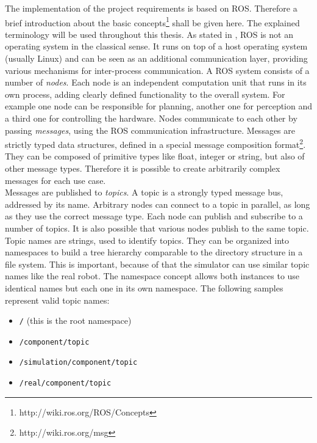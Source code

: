 The implementation of the project requirements is based on ROS. Therefore a brief introduction about the basic concepts\footnote{http://wiki.ros.org/ROS/Concepts} shall be given here. The explained terminology will be used throughout this thesis. As stated in \cite{quigley2009}, ROS is not an operating system in the classical sense. It runs on top of a host operating system (usually Linux) and can be seen as an additional communication layer, providing various mechanisms for inter-process communication. A ROS system consists of a number of \emph{nodes}. Each node is an independent computation unit that runs in its own process, adding clearly defined functionality to the overall system. For example one node can be responsible for planning, another one for perception and a third one for controlling the hardware. Nodes communicate to each other by passing \emph{messages}, using the ROS communication infrastructure. Messages are strictly typed data structures, defined in a special message composition format\footnote{http://wiki.ros.org/msg}. They can be composed of primitive types like float, integer or string, but also of other message types. Therefore it is possible to create arbitrarily complex messages for each use case. \\

Messages are published to \emph{topics}. A topic is a strongly typed message bus, addressed by its name. Arbitrary nodes can connect to a topic in parallel, as long as they use the correct message type. Each node can publish and subscribe to a number of topics. It is also possible that various nodes publish to the same topic. Topic names are strings, used to identify topics. They can be organized into namespaces to build a tree hierarchy comparable to the directory structure in a file system. This is important, because of that the simulator can use similar topic names like the real robot. The namespace concept allows both instances to use identical names but each one in its own namespace. The following samples represent valid topic names:
\begin{itemize}
\item \texttt{/} (this is the root namespace)
\item \texttt{/component/topic}
\item \texttt{/simulation/component/topic}
\item \texttt{/real/component/topic}
\end{itemize}

